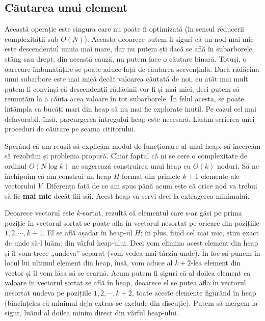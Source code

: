 \subsection{Căutarea unui element}

Această operație este singura care nu poate fi optimizată (în sensul reducerii
complexității sub $O(N)$). Aceasta deoarece putem fi siguri că un nod mai mic
este descendentul unuia mai mare, dar nu putem ști dacă se află în subarborele
stâng sau drept; din această cauză, nu putem face o căutare binară. Totuși, o
oarecare îmbunătățire se poate aduce față de căutarea secvențială. Dacă
rădăcina unui subarbore este mai mică decât valoarea căutată de noi, cu atât
mai mult putem fi convinși că descendenții rădăcinii vor fi și mai mici, deci
putem să renunțăm la a căuta acea valoare în tot subarborele. În felul acesta,
se poate întâmpla ca bucăți mari din heap să nu mai fie explorate inutil. Pe
cazul cel mai defavorabil, însă, parcurgerea întregului heap este
necesară. Lăsăm scrierea unei proceduri de căutare pe seama cititorului.

\begin{center}
  {\Huge \decofourleft \decofourright}
\end{center}

Sperând că am reușit să explicăm modul de funcționare al unui heap, să
încercăm să rezolvăm și problema propusă. Chiar faptul că ni se cere o
complexitate de ordinul $O(N \log k)$ ne sugerează construirea unui heap cu
$O(k)$ noduri. Să ne închipuim că am construi un heap $H$ format din primele
$k+1$ elemente ale vectorului $V$. Diferența față de ce am spus până acum este
că orice nod va trebui să fie {\bf mai mic} decât fiii săi. Acest heap va
servi deci la extragerea minimului.

Deoarece vectorul este $k$-sortat, rezultă că elementul care s-ar găsi pe
prima poziție în vectorul sortat se poate afla în vectorul nesortat pe oricare
din pozițiile $1, 2, \cdots, k+1$. El se află așadar în heap-ul $H$; în plus,
fiind cel mai mic, știm exact de unde să-l luăm: din vârful heap-ului. Deci
vom elimina acest element din heap și îl vom trece „undeva” separat (vom vedea
mai târziu unde). În loc să punem în locul lui ultimul element din heap, însă,
vom aduce al $k+2$-lea element din vector și îl vom lăsa să se cearnă. Acum
putem fi siguri că al doilea element ca valoare în vectorul sortat se află în
heap, deoarece el se putea afla în vectorul nesortat undeva pe pozițiile $1,
2, \cdots, k+2$, toate aceste elemente figurând în heap (bineînțeles că
minimul deja extras se exclude din discuție). Putem să mergem la sigur, luând
al doilea minim direct din vârful heap-ului.

